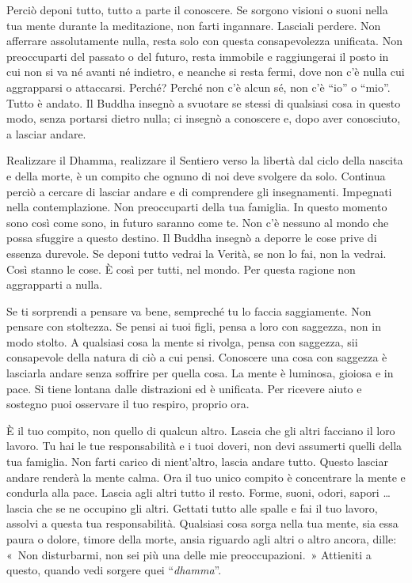 Perciò deponi tutto, tutto a parte il conoscere. Se sorgono visioni o
suoni nella tua mente durante la meditazione, non farti ingannare.
Lasciali perdere. Non afferrare assolutamente nulla, resta solo con
questa consapevolezza unificata. Non preoccuparti del passato o del
futuro, resta immobile e raggiungerai il posto in cui non si va né
avanti né indietro, e neanche si resta fermi, dove non c'è nulla cui
aggrapparsi o attaccarsi. Perché? Perché non c'è alcun sé, non c'è
``io'' o ``mio''. Tutto è andato. Il Buddha insegnò a svuotare se stessi
di qualsiasi cosa in questo modo, senza portarsi dietro nulla; ci
insegnò a conoscere e, dopo aver conosciuto, a lasciar andare.

Realizzare il Dhamma, realizzare il Sentiero verso la libertà dal ciclo
della nascita e della morte, è un compito che ognuno di noi deve
svolgere da solo. Continua perciò a cercare di lasciar andare e di
comprendere gli insegnamenti. Impegnati nella contemplazione. Non
preoccuparti della tua famiglia. In questo momento sono così come sono,
in futuro saranno come te. Non c'è nessuno al mondo che possa sfuggire a
questo destino. Il Buddha insegnò a deporre le cose prive di essenza
durevole. Se deponi tutto vedrai la Verità, se non lo fai, non la
vedrai. Così stanno le cose. È così per tutti, nel mondo. Per questa
ragione non aggrapparti a nulla.

Se ti sorprendi a pensare va bene, sempreché tu lo faccia saggiamente.
Non pensare con stoltezza. Se pensi ai tuoi figli, pensa a loro con
saggezza, non in modo stolto. A qualsiasi cosa la mente si rivolga,
pensa con saggezza, sii consapevole della natura di ciò a cui pensi.
Conoscere una cosa con saggezza è lasciarla andare senza soffrire per
quella cosa. La mente è luminosa, gioiosa e in pace. Si tiene lontana
dalle distrazioni ed è unificata. Per ricevere aiuto e sostegno puoi
osservare il tuo respiro, proprio ora.

È il tuo compito, non quello di qualcun altro. Lascia che gli altri
facciano il loro lavoro. Tu hai le tue responsabilità e i tuoi doveri,
non devi assumerti quelli della tua famiglia. Non farti carico di
nient'altro, lascia andare tutto. Questo lasciar andare renderà la mente
calma. Ora il tuo unico compito è concentrare la mente e condurla alla
pace. Lascia agli altri tutto il resto. Forme, suoni, odori, sapori \ldots{}
lascia che se ne occupino gli altri. Gettati tutto alle spalle e fai il
tuo lavoro, assolvi a questa tua responsabilità. Qualsiasi cosa sorga
nella tua mente, sia essa paura o dolore, timore della morte, ansia
riguardo agli altri o altro ancora, dille: «~Non disturbarmi, non sei
più una delle mie preoccupazioni.~» Attieniti a questo, quando vedi
sorgere quei ``\emph{dhamma}''.

